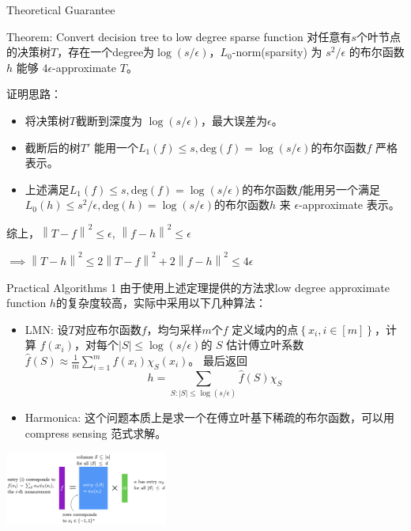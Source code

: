 \begin{frame}{Theoretical Guarantee}
    \begin{block}{Theorem: Convert decision tree to low degree sparse function}
        对任意有$s$个叶节点的决策树$T$，存在一个degree为$\log(s / \epsilon)$，$L_0$-norm(sparsity) 为 $s^{2} / \epsilon$ 的布尔函数 $h$ 能够 $4 \epsilon$-approximate $T$。 
    \end{block}
    证明思路：
    \begin{itemize}
        \item 将决策树$T$截断到深度为 $\log(s / \epsilon)$，最大误差为$\epsilon$。
        \item 截断后的树$T'$ 能用一个$L_1(f) \leqslant s, \text{deg}(f) = \log(s / \epsilon)$的布尔函数$f$ 严格表示。
        \item 上述满足$L_1(f) \leqslant s, \text{deg}(f) = \log(s / \epsilon)$的布尔函数$f$能用另一个满足$L_0(h) \leqslant s^{2} / \epsilon, \text{deg}(h) = \log (s / \epsilon)$的布尔函数$h$ 来 $\epsilon$-approximate 表示。
    \end{itemize}
    综上，$\left\| T-f \right\|^{2} \leqslant \epsilon$, $\left\| f-h \right\|^{2} \leqslant \epsilon$ 
    
    $\implies \left\| T - h \right\|^{2} \leqslant 2 \left\| T-f \right\|^{2} + 2 \left\| f-h \right\|^{2} \leqslant 4\epsilon$
\end{frame}

\begin{frame}{Practical Algorithms 1}
    由于使用上述定理提供的方法求low degree approximate function $h$的复杂度较高，实际中采用以下几种算法：
    \begin{itemize}
        \item LMN: 设$T$对应布尔函数$f$，均匀采样$m$个$f$ 定义域内的点$\left\{ x_i, i \in [m] \right\} $，计算 $f(x_i)$，对每个$|S| \leqslant \log(s / \epsilon)$的 $S$ 估计傅立叶系数$\hat{f}(S)\approx \frac{1}{m} \sum_{i=1}^{m} f(x_i) \chi _S(x_i)$。
        最后返回
        \[
            h = \sum_{S: |S| \leqslant \log(s / \epsilon)} \hat{f}(S) \chi _S
        \]
        \item Harmonica: 这个问题本质上是求一个在傅立叶基下稀疏的布尔函数，可以用compress sensing 范式求解。
    \end{itemize}
    \begin{center}
        \includegraphics[width=0.4\textwidth]{assets/harmonica.png}
    \end{center}

\end{frame}

